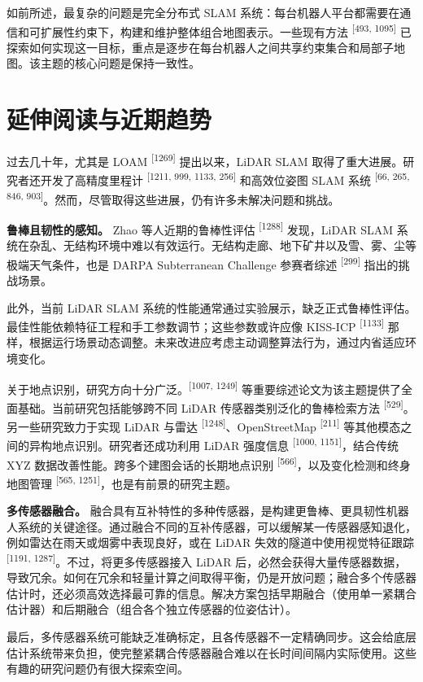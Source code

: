 如前所述，最复杂的问题是完全分布式 SLAM 系统：每台机器人平台都需要在通信和可扩展性约束下，构建和维护整体组合地图表示。一些现有方法 \textsuperscript{[493, 1095]} 已探索如何实现这一目标，重点是逐步在每台机器人之间共享约束集合和局部子地图。该主题的核心问题是保持一致性。

\section{延伸阅读与近期趋势}

过去几十年，尤其是 LOAM \textsuperscript{[1269]} 提出以来，LiDAR SLAM 取得了重大进展。研究者还开发了高精度里程计 \textsuperscript{[1211, 999, 1133, 256]} 和高效位姿图 SLAM 系统 \textsuperscript{[66, 265, 846, 903]}。然而，尽管取得这些进展，仍有许多未解决问题和挑战。

\textbf{鲁棒且韧性的感知。} Zhao 等人近期的鲁棒性评估 \textsuperscript{[1288]} 发现，LiDAR SLAM 系统在杂乱、无结构环境中难以有效运行。无结构走廊、地下矿井以及雪、雾、尘等极端天气条件，也是 DARPA Subterranean Challenge 参赛者综述 \textsuperscript{[299]} 指出的挑战场景。

此外，当前 LiDAR SLAM 系统的性能通常通过实验展示，缺乏正式鲁棒性评估。最佳性能依赖特征工程和手工参数调节；这些参数或许应像 KISS-ICP \textsuperscript{[1133]} 那样，根据运行场景动态调整。未来改进应考虑主动调整算法行为，通过内省适应环境变化。

关于地点识别，研究方向十分广泛。\textsuperscript{[1007, 1249]} 等重要综述论文为该主题提供了全面基础。当前研究包括能够跨不同 LiDAR 传感器类别泛化的鲁棒检索方法 \textsuperscript{[529]}。另一些研究致力于实现 LiDAR 与雷达 \textsuperscript{[1248]}、OpenStreetMap \textsuperscript{[211]} 等其他模态之间的异构地点识别。研究者还成功利用 LiDAR 强度信息 \textsuperscript{[1000, 1151]}，结合传统 XYZ 数据改善性能。跨多个建图会话的长期地点识别 \textsuperscript{[566]}，以及变化检测和终身地图管理 \textsuperscript{[565, 1251]}，也是有前景的研究主题。

\textbf{多传感器融合。} 融合具有互补特性的多种传感器，是构建更鲁棒、更具韧性机器人系统的关键途径。通过融合不同的互补传感器，可以缓解某一传感器感知退化，例如雷达在雨天或烟雾中表现良好，或在 LiDAR 失效的隧道中使用视觉特征跟踪 \textsuperscript{[1191, 1287]}。不过，将更多传感器接入 LiDAR 后，必然会获得大量传感器数据，导致冗余。如何在冗余和轻量计算之间取得平衡，仍是开放问题；融合多个传感器估计时，还必须高效选择最可靠的信息。解决方案包括早期融合（使用单一紧耦合估计器）和后期融合（组合各个独立传感器的位姿估计）。

最后，多传感器系统可能缺乏准确标定，且各传感器不一定精确同步。这会给底层估计系统带来负担，使完整紧耦合传感器融合难以在长时间间隔内实际使用。这些有趣的研究问题仍有很大探索空间。

